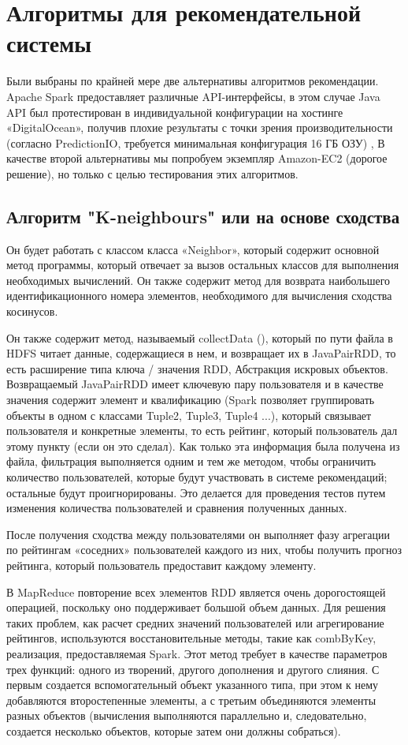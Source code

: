 \section{Алгоритмы для рекомендательной системы}

Были выбраны по крайней мере две альтернативы алгоритмов рекомендации. Apache Spark предоставляет различные API-интерфейсы, в этом случае Java API был протестирован в индивидуальной конфигурации на хостинге «DigitalOcean», получив плохие результаты с точки зрения производительности (согласно PredictionIO, требуется минимальная конфигурация 16 ГБ ОЗУ) , В качестве второй альтернативы мы попробуем экземпляр Amazon-EC2 \cite{ec2}(дорогое решение), но только с целью тестирования этих алгоритмов.

\subsection{Алгоритм "K-neighbours" или на основе сходства}

Он будет работать с классом класса «Neighbor», который содержит основной метод программы, который отвечает за вызов остальных классов для выполнения необходимых вычислений. Он также содержит метод для возврата наибольшего идентификационного номера элементов, необходимого для вычисления сходства косинусов.

Он также содержит метод, называемый collectData (), который по пути файла в HDFS читает данные, содержащиеся в нем, и возвращает их в JavaPairRDD, то есть расширение типа ключа / значения RDD, Абстракция искровых объектов. Возвращаемый JavaPairRDD имеет ключевую пару пользователя и в качестве значения содержит элемент и квалификацию (Spark позволяет группировать объекты в одном с классами Tuple2, Tuple3, Tuple4 ...), который связывает пользователя и конкретные элементы, то есть рейтинг, который пользователь дал этому пункту (если он это сделал). Как только эта информация была получена из файла, фильтрация выполняется одним и тем же методом, чтобы ограничить количество пользователей, которые будут участвовать в системе рекомендаций; остальные будут проигнорированы. Это делается для проведения тестов путем изменения количества пользователей и сравнения полученных данных.

После получения сходства между пользователями он выполняет фазу агрегации по рейтингам «соседних» пользователей каждого из них, чтобы получить прогноз рейтинга, который пользователь предоставит каждому элементу.

В MapReduce повторение всех элементов RDD является очень дорогостоящей операцией, поскольку оно поддерживает большой объем данных. Для решения таких проблем, как расчет средних значений пользователей или агрегирование рейтингов, используются восстановительные методы, такие как combByKey, реализация, предоставляемая Spark. Этот метод требует в качестве параметров трех функций: одного из творений, другого дополнения и другого слияния. С первым создается вспомогательный объект указанного типа, при этом к нему добавляются второстепенные элементы, а с третьим объединяются элементы разных объектов (вычисления выполняются параллельно и, следовательно, создается несколько объектов, которые затем они должны собраться).
